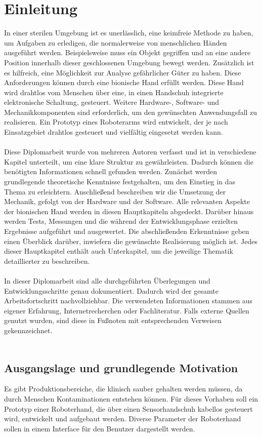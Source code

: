 \documentclass[titlepage,12pt,twoside]{article}
\begin{document}
\section{Einleitung}
\label{chap:Einleitung}
In einer sterilen Umgebung ist es unerlässlich, eine keimfreie Methode zu haben, um Aufgaben zu erledigen, die normalerweise von 
menschlichen Händen ausgeführt werden. Beispielsweise muss ein Objekt gegriffen und an eine andere Position innerhalb dieser 
geschlossenen Umgebung bewegt werden. Zusätzlich ist es hilfreich, eine Möglichkeit zur Analyse gefährlicher Güter zu haben.
Diese Anforderungen können durch eine bionische Hand erfüllt werden. Diese Hand wird drahtlos vom Menschen über eine, in einen 
Handschuh integrierte elektronische Schaltung, gesteuert. Weitere Hardware-, Software- und Mechanikkomponenten sind erforderlich, 
um den gewünschten Anwendungsfall zu realisieren. Ein Prototyp eines Roboterarms wird entwickelt, der je nach Einsatzgebiet 
drahtlos gesteuert und vielfältig eingesetzt werden kann. \\
\\
Diese Diplomarbeit wurde von mehreren Autoren verfasst und ist in verschiedene Kapitel unterteilt, um eine klare Struktur zu 
gewährleisten. Dadurch können die benötigten Informationen schnell gefunden werden. Zunächst werden grundlegende theoretische 
Kenntnisse festgehalten, um den Einstieg in das Thema zu erleichtern. Anschließend beschreiben wir die Umsetzung der Mechanik, 
gefolgt von der Hardware und der Software. Alle relevanten Aspekte der bionischen Hand werden in diesen Hauptkapiteln abgedeckt. 
Darüber hinaus werden Tests, Messungen und die während der Entwicklungsphase erzielten Ergebnisse aufgeführt und ausgewertet. Die 
abschließenden Erkenntnisse geben einen Überblick darüber, inwiefern die gewünschte Realisierung möglich ist. Jedes dieser 
Hauptkapitel enthält auch Unterkapitel, um die jeweilige Thematik detaillierter zu beschreiben. \\
\\
In dieser Diplomarbeit sind alle durchgeführten Überlegungen und Entwicklungsschritte genau dokumentiert. Dadurch wird der gesamte 
Arbeitsfortschritt nachvollziehbar. Die verwendeten Informationen stammen aus eigener Erfahrung, Internetrecherchen oder 
Fachliteratur. Falls externe Quellen genutzt wurden, sind diese in Fußnoten mit entsprechenden Verweisen gekennzeichnet. \\
\\

\subsection{Ausgangslage und grundlegende Motivation}
\label{chap:Ausgangslage und grundlegende Motivation}
Es gibt Produktionsbereiche, die klinisch sauber gehalten werden müssen, da durch Menschen Kontaminationen entstehen
können. Für dieses Vorhaben soll ein Prototyp einer Roboterhand, die über einen Sensorhandschuh kabellos gesteuert wird,
entwickelt und aufgebaut werden. Diverse Parameter der Roboterhand sollen in einem Interface für den Benutzer 
dargestellt werden. \\
\end{document}
